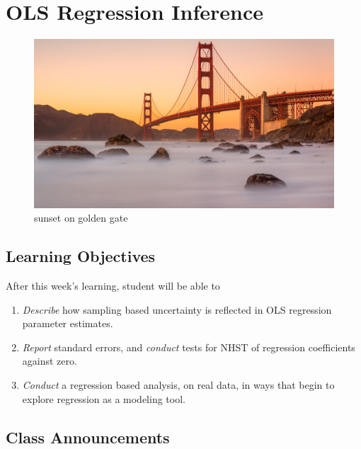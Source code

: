 \documentclass[
]{book}
\providecommand{\tightlist}{%
  \setlength{\itemsep}{0pt}\setlength{\parskip}{0pt}}
\theoremstyle{definition}
\theoremstyle{definition}
\theoremstyle{definition}
\theoremstyle{definition}
\theoremstyle{remark}
\begin{document}
\hypertarget{ols-regression-inference}{%
\chapter{OLS Regression Inference}\label{ols-regression-inference}}

\begin{figure}
\centering
\includegraphics{./images/bridge_sunset.jpeg}
\caption{sunset on golden gate}
\end{figure}

\hypertarget{learning-objectives-8}{%
\section{Learning Objectives}\label{learning-objectives-8}}

After this week's learning, student will be able to

\begin{enumerate}
\def\labelenumi{\arabic{enumi}.}
\tightlist
\item
  \emph{Describe} how sampling based uncertainty is reflected in OLS regression parameter estimates.
\item
  \emph{Report} standard errors, and \emph{conduct} tests for NHST of regression coefficients against zero.
\item
  \emph{Conduct} a regression based analysis, on real data, in ways that begin to explore regression as a modeling tool.
\end{enumerate}

\hypertarget{class-announcements-7}{%
\section{Class Announcements}\label{class-announcements-7}}
\end{document}
